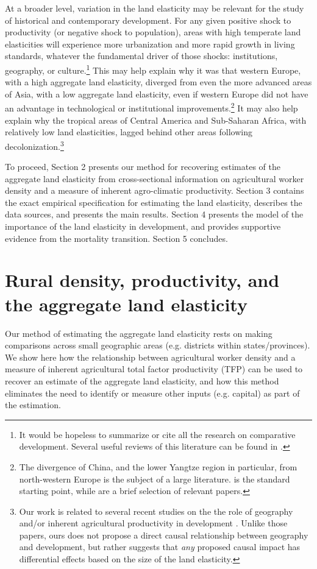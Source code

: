 \documentclass[11pt]{article}
\begin{document}
At a broader level, variation in the land elasticity may be relevant for the study of historical and contemporary development. For any given positive shock to productivity (or negative shock to population), areas with high temperate land elasticities will experience more urbanization and more rapid growth in living standards, whatever the fundamental driver of those shocks: institutions, geography, or culture.\footnote{It would be hopeless to summarize or cite all the research on comparative development. Several useful reviews of this literature can be found in \cite{ajr2005handbook,nunn_2009,Galor:2011uq,sw2013,vries2013}.} This may help explain why it was that western Europe, with a high aggregate land elasticity, diverged from even the more advanced areas of Asia, with a low aggregate land elasticity, even if western Europe did not have an advantage in technological or institutional improvements.\footnote{The divergence of China, and the lower Yangtze region in particular, from north-western Europe is the subject of a large literature. \citet{pom2000} is the standard starting point, while \citet{allen11,huang2002,ma2013,lee2002,bg2006} are a brief selection of relevant papers.} It may also help explain why the tropical areas of Central America and Sub-Saharan Africa, with relatively low land elasticities, lagged behind other areas following decolonization.\footnote{Our work is related to several recent studies on the the role of geography and/or inherent agricultural productivity in development \citep{oh2005,ashraf2010dynamics,Nunn2011,Nunn2012,mich2012,agn2013,cook14,cook2014role,fenske2014,alsan2015,ashrafmich2015,dks2015,galorozak2016,litina2016,ads2016,FrankemaPap2017}. Unlike those papers, ours does not propose a direct causal relationship between geography and development, but rather suggests that \textit{any} proposed causal impact has differential effects based on the size of the land elasticity.} 

To proceed, Section 2 presents our method for recovering estimates of the aggregate land elasticity from cross-sectional information on agricultural worker density and a measure of inherent agro-climatic productivity. Section 3 contains the exact empirical specification for estimating the land elasticity, describes the data sources, and presents the main results. Section 4 presents the model of the importance of the land elasticity in development, and provides supportive evidence from the mortality transition. Section 5 concludes.

\section{Rural density, productivity, and the aggregate land elasticity}\label{SEC_agmodel}
Our method of estimating the aggregate land elasticity rests on making comparisons across small geographic areas (e.g. districts within states/provinces). We show here how the relationship between agricultural worker density and a measure of inherent agricultural total factor productivity (TFP) can be used to recover an estimate of the aggregate land elasticity, and how this method eliminates the need to identify or measure other inputs (e.g. capital) as part of the estimation.
\end{document}
